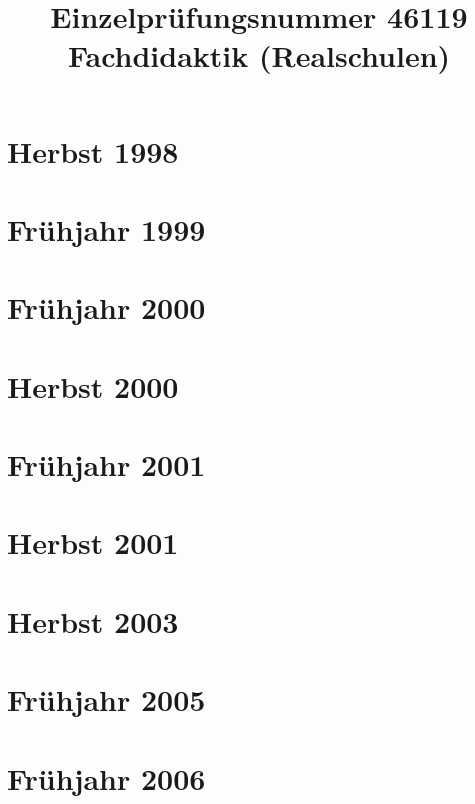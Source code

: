 \documentclass{lehramt-informatik-examen-sammlung}
\title{Einzelprüfungsnummer 46119\\Fachdidaktik (Realschulen)}
\begin{document}
\maketitle
\tableofcontents

\section{Herbst 1998}


\section{Frühjahr 1999}


\section{Frühjahr 2000}


\section{Herbst 2000}


\section{Frühjahr 2001}


\section{Herbst 2001}


\section{Herbst 2003}


\section{Frühjahr 2005}


\section{Frühjahr 2006}

\end{document}
